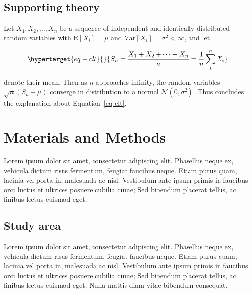 \documentclass[
  oneside,
  open=any]{scrbook}
\begin{document}
\hypertarget{supporting-theory}{%
\section{Supporting theory}\label{supporting-theory}}

Let \(X_1, X_2, \ldots, X_n\) be a sequence of independent and
identically distributed random variables with \(\text{E}[X_i] = \mu\)
and \(\text{Var}[X_i] = \sigma^2 < \infty\), and let

\begin{equation}\protect\hypertarget{eq-clt}{}{
S_n = \frac{X_1 + X_2 + \cdots + X_n}{n}
      = \frac{1}{n}\sum_{i}^{n} X_i
}\label{eq-clt}\end{equation}

denote their mean. Then as \(n\) approaches infinity, the random
variables \(\sqrt{n}(S_n - \mu)\) converge in distribution to a normal
\(\mathcal{N}(0, \sigma^2)\). Thus concludes the explanation about
Equation~\ref{eq-clt}.

\hypertarget{materials-and-methods}{%
\chapter{Materials and Methods}\label{materials-and-methods}}

Lorem ipsum dolor sit amet, consectetur adipiscing elit. Phasellus neque
ex, vehicula dictum risus fermentum, feugiat faucibus neque. Etiam purus
quam, lacinia vel porta in, malesuada ac nisl. Vestibulum ante ipsum
primis in faucibus orci luctus et ultrices posuere cubilia curae; Sed
bibendum placerat tellus, ac finibus lectus euismod eget.

\hypertarget{study-area}{%
\section{Study area}\label{study-area}}

Lorem ipsum dolor sit amet, consectetur adipiscing elit. Phasellus neque
ex, vehicula dictum risus fermentum, feugiat faucibus neque. Etiam purus
quam, lacinia vel porta in, malesuada ac nisl. Vestibulum ante ipsum
primis in faucibus orci luctus et ultrices posuere cubilia curae; Sed
bibendum placerat tellus, ac finibus lectus euismod eget. Nulla mattis
diam vitae bibendum consequat.
\end{document}
